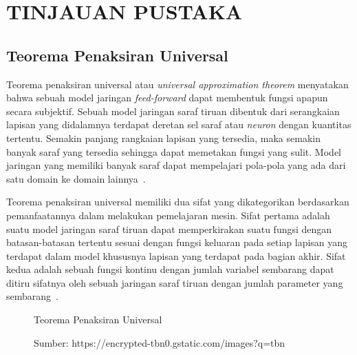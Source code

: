 

\chapter{TINJAUAN PUSTAKA}
\label{cha:2-TinjauanPustaka}

\section{Teorema Penaksiran Universal}
\label{sec:2-TeoremaPenaksiranUniversal}

Teorema penaksiran universal atau \textit{universal approximation theorem} menyatakan bahwa sebuah
model jaringan \textit{feed-forward} dapat membentuk fungsi apapun secara subjektif. Sebuah model
jaringan saraf tiruan dibentuk dari serangkaian lapisan yang didalamnya terdapat deretan sel saraf
atau \textit{neuron} dengan kuantitas tertentu. Semakin panjang rangkaian lapisan yang tersedia,
maka semakin banyak saraf yang tersedia sehingga dapat memetakan fungsi yang sulit.
Model jaringan yang memiliki banyak saraf dapat mempelajari pola-pola yang ada dari satu
domain ke domain lainnya~\cite{2016arXiv160100013G}.

Teorema penaksiran universal memiliki dua sifat yang dikategorikan berdasarkan pemanfaatannya dalam
melakukan pemelajaran mesin. Sifat pertama adalah suatu model jaringan saraf tiruan dapat
memperkirakan suatu fungsi dengan batasan-batasan tertentu sesuai dengan fungsi keluaran pada setiap
lapisan yang terdapat dalam model khususnya lapisan yang terdapat pada bagian akhir.
Sifat kedua adalah sebuah fungsi kontinu dengan jumlah variabel sembarang dapat
ditiru sifatnya oleh sebuah jaringan saraf tiruan dengan jumlah parameter yang sembarang~\cite{2019arXiv191003344K}.

\begin{figure}[htbp]
    \begin{center}
    \end{center}
    \vspace{-20pt}
    \captionsetup{labelfont=bf, textfont=bf}
    \caption{Teorema Penaksiran Universal}
    \vspace{-10pt}
    \captionsetup{labelfont=md, textfont=md}
    \caption*{Sumber: https://encrypted-tbn0.gstatic.com/images?q=tbn}
    \label{fig:uat}
\end{figure}

